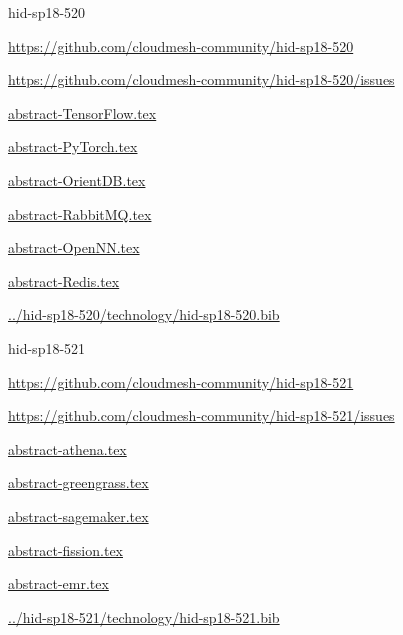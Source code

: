 \begin{IU}

hid-sp18-520

\url{https://github.com/cloudmesh-community/hid-sp18-520}

\url{https://github.com/cloudmesh-community/hid-sp18-520/issues}

\href{https://github.com/cloudmesh-community/hid-sp18-520/blob/master//technology/abstract-TensorFlow.tex}{abstract-TensorFlow.tex}

\href{https://github.com/cloudmesh-community/hid-sp18-520/blob/master//technology/abstract-PyTorch.tex}{abstract-PyTorch.tex}

\href{https://github.com/cloudmesh-community/hid-sp18-520/blob/master//technology/abstract-OrientDB.tex}{abstract-OrientDB.tex}

\href{https://github.com/cloudmesh-community/hid-sp18-520/blob/master//technology/abstract-RabbitMQ.tex}{abstract-RabbitMQ.tex}

\href{https://github.com/cloudmesh-community/hid-sp18-520/blob/master//technology/abstract-OpenNN.tex}{abstract-OpenNN.tex}

\href{https://github.com/cloudmesh-community/hid-sp18-520/blob/master//technology/abstract-Redis.tex}{abstract-Redis.tex}

\href{https://github.com/cloudmesh-community/hid-sp18-520/blob/master//technology/hid-sp18-520.bib}{../hid-sp18-520/technology/hid-sp18-520.bib}

\end{IU}


\begin{IU}

hid-sp18-521

\url{https://github.com/cloudmesh-community/hid-sp18-521}

\url{https://github.com/cloudmesh-community/hid-sp18-521/issues}

\href{https://github.com/cloudmesh-community/hid-sp18-521/blob/master//technology/abstract-athena.tex}{abstract-athena.tex}

\href{https://github.com/cloudmesh-community/hid-sp18-521/blob/master//technology/abstract-greengrass.tex}{abstract-greengrass.tex}

\href{https://github.com/cloudmesh-community/hid-sp18-521/blob/master//technology/abstract-sagemaker.tex}{abstract-sagemaker.tex}

\href{https://github.com/cloudmesh-community/hid-sp18-521/blob/master//technology/abstract-fission.tex}{abstract-fission.tex}

\href{https://github.com/cloudmesh-community/hid-sp18-521/blob/master//technology/abstract-emr.tex}{abstract-emr.tex}

\href{https://github.com/cloudmesh-community/hid-sp18-521/blob/master//technology/hid-sp18-521.bib}{../hid-sp18-521/technology/hid-sp18-521.bib}

\end{IU}


